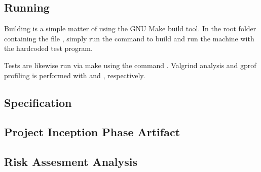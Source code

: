 \subsection{Running \thename{}}
\label{sec:appendix:make}

Building \thename{} is a simple matter of using the GNU Make build tool. In the
root folder containing the file , simply run the command
 to build and run the machine with the hardcoded test program.

Tests are likewise run via make using the command . Valgrind
analysis and gprof profiling is performed with  and
, respectively.

\subsection{\thename{} Specification}
\label{sec:appendix:spec}


\subsection{Project Inception Phase Artifact}
\label{appendix:inception-artifact}


\subsection{Risk Assesment Analysis}
\label{appendix:risk-assessment}

